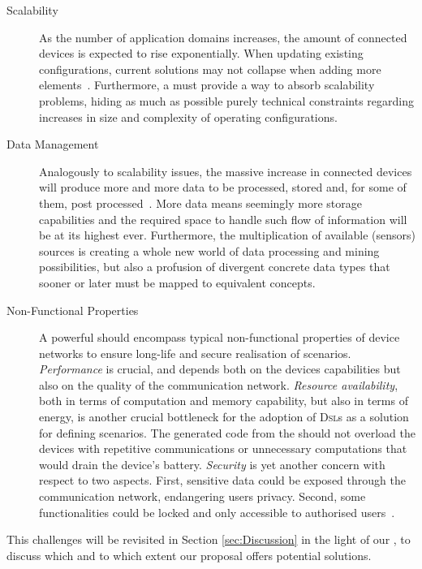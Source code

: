 \begin{description}
	\item[Scalability] As the number of application domains increases, the amount of connected devices is expected to rise exponentially. When updating existing \IOT configurations, current solutions may not collapse when adding more elements~\cite{mukho-14}. Furthermore, a \DSL must provide a way to absorb scalability problems, hiding as much as possible purely technical constraints regarding increases in size and complexity of operating configurations. 
	
	\item[Data Management] Analogously to scalability issues, the massive increase in connected devices will produce more and more data to be processed, stored and, for some of them, post processed~\cite{lee-15}. More data means seemingly more storage capabilities and the required space to handle such flow of information will be at its highest ever. Furthermore, the multiplication of available (sensors) sources is creating a whole new world of data processing and mining possibilities, but also a profusion of divergent concrete data types that sooner or later must be mapped to equivalent concepts.
	
	\item[Non-Functional Properties] A powerful \DSL should encompass typical non-functional properties of device networks to ensure long-life and secure realisation of scenarios. \emph{Performance} is crucial, and depends both on the devices capabilities but also on the quality of the communication network. \emph{Resource availability}, both in terms of computation and memory capability, but also in terms of energy, is another crucial bottleneck for the adoption of \textsc{Dsl}s as a solution for defining scenarios. The generated code from the \DSL should not overload the devices with repetitive communications or unnecessary computations that would drain the device's battery. \emph{Security} is yet another concern with respect to two aspects. First, sensitive data could be exposed through the communication network, endangering users privacy. Second, some functionalities could be locked and only accessible to authorised users~\cite{tan-10}.
\end{description}
This challenges will be revisited in Section \ref{sec:Discussion} in the light of our \IOTDSL, to discuss which and to which extent our proposal offers potential solutions.